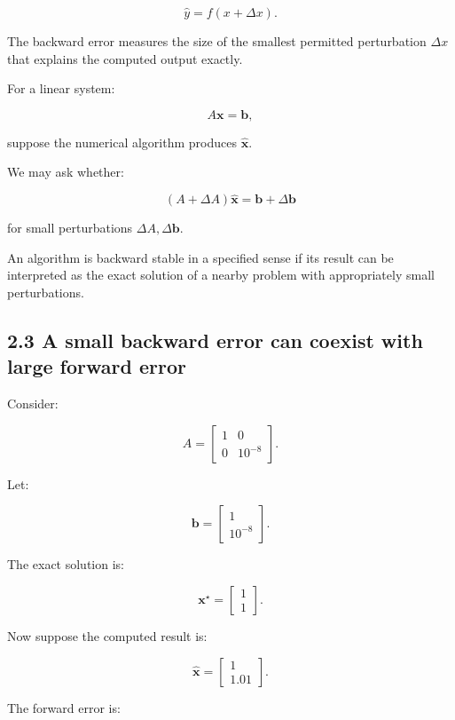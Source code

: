 \[ \boxed{ \hat y=f(x+\Delta x) }. \]

The backward error measures the size of the smallest permitted perturbation \(\Delta x\) that explains the computed output exactly.

For a linear system:

\[ A\mathbf x=\mathbf b, \]

suppose the numerical algorithm produces \(\hat{\mathbf x}\).

We may ask whether:

\[ (A+\Delta A)\hat{\mathbf x} = \mathbf b+\Delta\mathbf b \]

for small perturbations \(\Delta A,\Delta\mathbf b\).

An algorithm is backward stable in a specified sense if its result can be interpreted as the exact solution of a nearby problem with appropriately small perturbations.

\subsection{2.3 A small backward error can coexist with large forward error}\label{02-foundations-ii-ch028-a-small-backward-error-can-coexist-with-large-forward-error}

\hypertarget{02-foundations-ii-ch028-a-small-backward-error-can-coexist-with-large-forward-error}{}

Consider:

\[ A= \begin{bmatrix} 1&0\\ 0&10^{-8} \end{bmatrix}. \]

Let:

\[ \mathbf b= \begin{bmatrix} 1\\ 10^{-8} \end{bmatrix}. \]

The exact solution is:

\[ \mathbf x^\star= \begin{bmatrix} 1\\ 1 \end{bmatrix}. \]

Now suppose the computed result is:

\[ \hat{\mathbf x}= \begin{bmatrix} 1\\ 1.01 \end{bmatrix}. \]

The forward error is:

